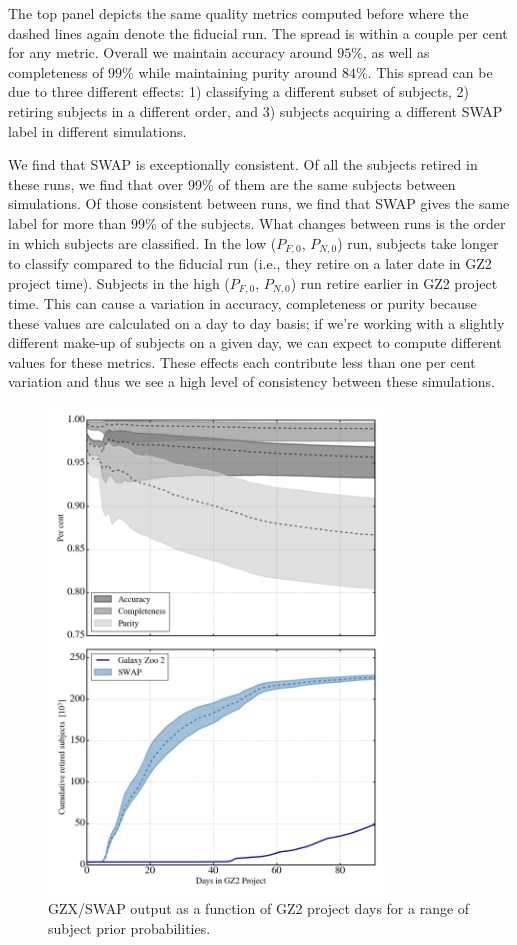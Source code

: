 \documentclass[twocolumn]{aastex6}
\newcommand{\Pf}{$P_{F,0}$}
\newcommand{\Pn}{$P_{N,0}$}
\begin{document}
The top panel depicts the same quality metrics computed before where the dashed 
lines again denote the fiducial run.  The spread is within a couple per cent for any
metric. Overall we maintain accuracy around $95\%$, as well as completeness of $99\%$
while maintaining purity around $84\%$. This spread can be due to three different
effects: 1) classifying a different subset of subjects, 2) retiring subjects in a different
order, and 3) subjects acquiring a different SWAP label in different simulations. 

We find that SWAP is exceptionally consistent. Of all the subjects retired in
these runs, we find that over 99\% of them are the same subjects between simulations.
Of those consistent between runs, we find that SWAP gives the same label for 
more than 99\% of the subjects. What changes between runs is the order in 
which subjects are classified. In the low (\Pf, \Pn) run, subjects take longer to classify 
compared to the fiducial run (i.e., they retire on a later date in GZ2 project time). 
Subjects in the high (\Pf, \Pn) run retire earlier in GZ2 project time. This can cause
a variation in accuracy, completeness or purity because these values are 
calculated on a day to day basis; if we're working with a slightly different make-up
of subjects on a given day, we can expect to compute different values for these metrics.
These effects each contribute less than one per cent variation and thus we see a 
high level of consistency between these simulations. 



\begin{figure}[t!]
\includegraphics[width=3.5in]{figures/GZX_eval_and_retirement_prior_spread_4paper_v2.png}
\caption{GZX/SWAP output as a function of GZ2 project days for a range of subject prior probabilities.  \label{fig: priorAnalysis}}
\end{figure}
\end{document}
